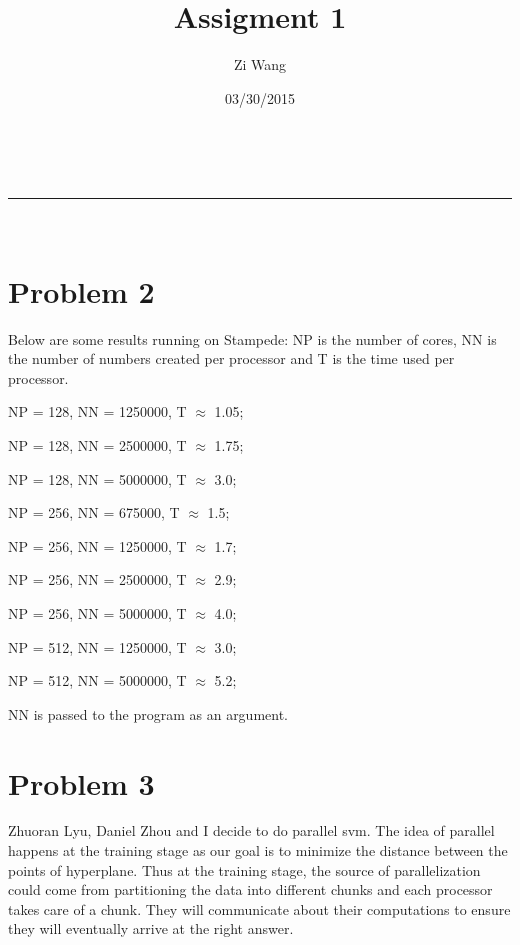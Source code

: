 \documentclass[a4paper,11pt]{article}
\makeatletter
\newcommand{\linia}{\rule{\linewidth}{0.5pt}}
\theoremstyle{mytheor}
\theoremstyle{mytheor}
\renewcommand{\maketitle}{
\begin{center}
\vspace{2ex}
{\huge \textsc{\@title}}
\vspace{1ex}
\\
\linia\\
\@author \hfill \@date
\vspace{4ex}
\end{center}
}
\makeatother
\begin{document}
\title{Assigment 1}

\author{Zi Wang}

\date{03/30/2015}

\maketitle

\section{Problem 2}
Below are some results running on Stampede: NP is the number of cores, NN is the number of numbers created per processor and T is the time used per processor.

NP = 128, NN = 1250000, T $\approx$ 1.05;

NP = 128, NN = 2500000, T $\approx$ 1.75;

NP = 128, NN = 5000000, T $\approx$ 3.0;

NP = 256, NN = 675000, T $\approx$ 1.5;

NP = 256, NN = 1250000, T $\approx$ 1.7;

NP = 256, NN = 2500000, T $\approx$ 2.9;

NP = 256, NN = 5000000, T $\approx$ 4.0;

NP = 512, NN = 1250000, T $\approx$ 3.0;

NP = 512, NN = 5000000, T $\approx$ 5.2;

NN is passed to the program as an argument.


\section{Problem 3}

Zhuoran Lyu, Daniel Zhou and I decide to do parallel svm. The idea of parallel happens at the training stage as our goal is to minimize the distance between the points of hyperplane. Thus at the training stage, the source of parallelization could come from partitioning the data into different chunks and each processor takes care of a chunk. They will communicate about their computations to ensure they will eventually arrive at the right answer.
\end{document}
